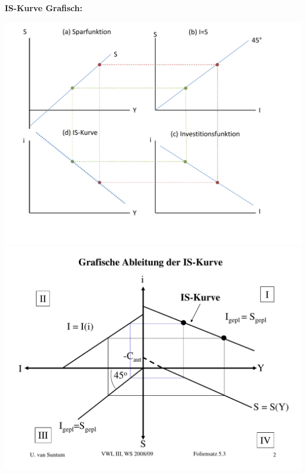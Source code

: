 \documentclass{scrartcl}
\begin{document}
\begin{enumerate}[(a)]
\textbf{IS-Kurve Grafisch:}
\begin{center}
  \includegraphics[width=\textwidth]{Bilder/ISgrafisch.pdf}
  \includegraphics[width=\textwidth]{Bilder/ISgrafisch2.pdf}
\end{center}


\end{enumerate}
\end{document}
